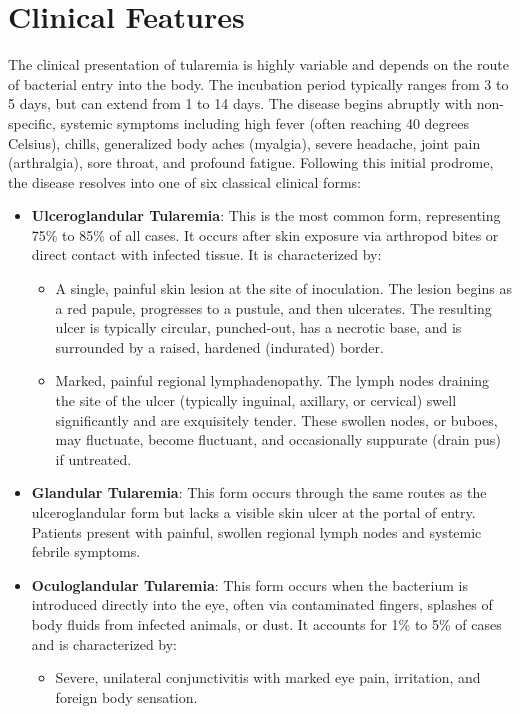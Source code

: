 \section*{Clinical Features}
The clinical presentation of tularemia is highly variable and depends on the route of bacterial entry into the body. The incubation period typically ranges from 3 to 5 days, but can extend from 1 to 14 days. The disease begins abruptly with non-specific, systemic symptoms including high fever (often reaching 40 degrees Celsius), chills, generalized body aches (myalgia), severe headache, joint pain (arthralgia), sore throat, and profound fatigue. Following this initial prodrome, the disease resolves into one of six classical clinical forms:
\begin{itemize}
    \item \textbf{Ulceroglandular Tularemia}: This is the most common form, representing 75\% to 85\% of all cases. It occurs after skin exposure via arthropod bites or direct contact with infected tissue. It is characterized by:
    \begin{itemize}
        \item A single, painful skin lesion at the site of inoculation. The lesion begins as a red papule, progresses to a pustule, and then ulcerates. The resulting ulcer is typically circular, punched-out, has a necrotic base, and is surrounded by a raised, hardened (indurated) border.
        \item Marked, painful regional lymphadenopathy. The lymph nodes draining the site of the ulcer (typically inguinal, axillary, or cervical) swell significantly and are exquisitely tender. These swollen nodes, or buboes, may fluctuate, become fluctuant, and occasionally suppurate (drain pus) if untreated.
    \end{itemize}
    \item \textbf{Glandular Tularemia}: This form occurs through the same routes as the ulceroglandular form but lacks a visible skin ulcer at the portal of entry. Patients present with painful, swollen regional lymph nodes and systemic febrile symptoms.
    \item \textbf{Oculoglandular Tularemia}: This form occurs when the bacterium is introduced directly into the eye, often via contaminated fingers, splashes of body fluids from infected animals, or dust. It accounts for 1\% to 5\% of cases and is characterized by:
    \begin{itemize}
        \item Severe, unilateral conjunctivitis with marked eye pain, irritation, and foreign body sensation.

\end{itemize}
\end{itemize}

